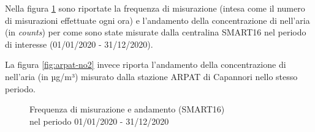 Nella figura \ref{fig:smart16-no2} sono riportate la frequenza di misurazione (intesa come il numero di misurazioni effettuate ogni ora) e l'andamento della concentrazione di  nell'aria (in \textit{counts}) per come sono state misurate dalla centralina SMART16 nel periodo di interesse (01/01/2020 - 31/12/2020).

La figura \ref{fig:arpat-no2} invece riporta l'andamento della concentrazione di  nell'aria (in µg/m³) misurato dalla stazione ARPAT di Capannori nello stesso periodo.

\clearpage
\begin{figure}[H]%
    \centering
    \captionsetup{justification=centering}
    \caption{Frequenza di misurazione e andamento  (SMART16)\\nel periodo 01/01/2020 - 31/12/2020}%
    \label{fig:smart16-no2}%
\end{figure}

